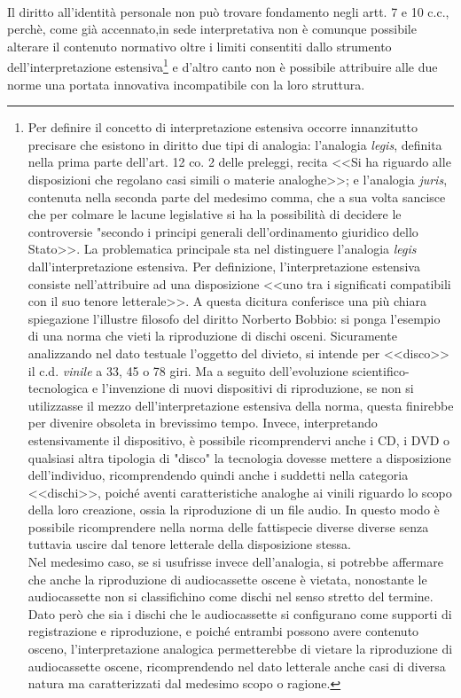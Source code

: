 \\Il diritto all'identità personale non può trovare fondamento negli artt. 7 e 10 c.c., perchè, come già accennato,in sede interpretativa non è comunque possibile alterare il contenuto normativo oltre i limiti consentiti dallo strumento dell'interpretazione estensiva\footnote{Per definire il concetto di interpretazione estensiva occorre innanzitutto precisare che esistono in diritto due tipi di analogia: l'analogia \textit{legis}, definita nella prima parte dell'art. 12 co. 2 delle preleggi, recita <<Si ha riguardo alle disposizioni che regolano casi simili o materie analoghe>>; e l'analogia \textit{juris}, contenuta nella seconda parte del medesimo comma, che a sua volta sancisce che per colmare le lacune legislative si ha la possibilità di decidere le controversie "secondo i principi generali dell'ordinamento giuridico dello Stato>>.
La problematica principale sta nel distinguere l'analogia \textit{legis} dall'interpretazione estensiva. Per definizione, l'interpretazione estensiva consiste nell'attribuire ad una disposizione <<uno tra i significati compatibili con il suo tenore letterale>>.
A questa dicitura conferisce una più chiara spiegazione l'illustre filosofo del diritto Norberto Bobbio: si ponga l'esempio di una norma che vieti la riproduzione di dischi osceni.
Sicuramente analizzando nel dato testuale l'oggetto del divieto, si intende per <<disco>> il c.d. \textit{vinile} a 33, 45 o 78 giri.
Ma a seguito dell'evoluzione scientifico-tecnologica e l'invenzione di nuovi dispositivi di riproduzione, se non si utilizzasse il mezzo dell'interpretazione estensiva della norma, questa finirebbe per divenire obsoleta in brevissimo tempo. Invece, interpretando estensivamente il dispositivo, è possibile ricomprendervi anche i CD, i DVD o qualsiasi altra tipologia di "disco" la tecnologia dovesse mettere a disposizione dell'individuo, ricomprendendo quindi anche i suddetti nella categoria <<dischi>>, poiché aventi caratteristiche analoghe ai vinili riguardo lo scopo della loro creazione, ossia la riproduzione di un file audio. 
In questo modo è possibile ricomprendere nella norma delle fattispecie diverse diverse senza tuttavia uscire dal tenore letterale della disposizione stessa.
\\Nel medesimo caso, se si usufrisse invece dell'analogia, si potrebbe affermare che anche la riproduzione di audiocassette oscene è vietata, nonostante le audiocassette non si classifichino come dischi nel senso stretto del termine. Dato però che sia i dischi che le audiocassette si configurano come supporti di registrazione e riproduzione, e poiché entrambi possono avere contenuto osceno, l'interpretazione analogica permetterebbe di vietare la riproduzione di audiocassette oscene, ricomprendendo nel dato letterale anche casi di diversa natura ma caratterizzati dal medesimo scopo o ragione.} e d'altro canto non è possibile attribuire alle due norme una portata innovativa incompatibile con la loro struttura. 
